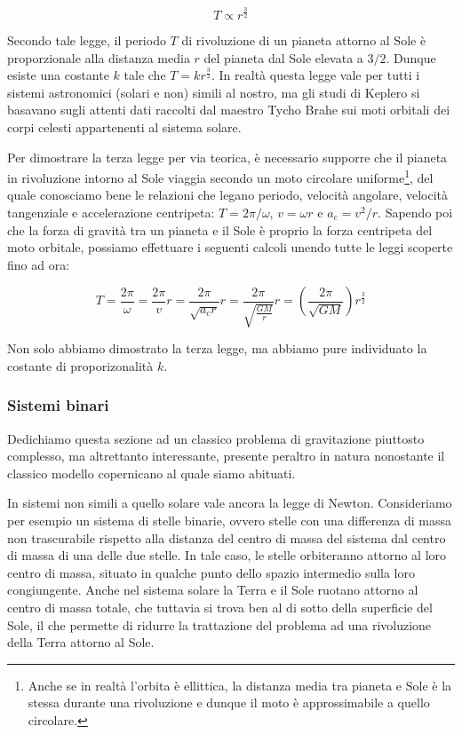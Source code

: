 \[ T \propto r^\frac{3}{2} \]

\noindent Secondo tale legge, il periodo $T$ di rivoluzione di un pianeta attorno al Sole
è proporzionale alla distanza media $r$ del pianeta dal Sole elevata a $3/2$. Dunque esiste
una costante $k$ tale che $T = kr^\frac{3}{2}$. In realtà
questa legge vale per tutti i sistemi astronomici (solari e non) simili al nostro, ma
gli studi di Keplero si basavano sugli attenti dati raccolti dal maestro Tycho Brahe
sui moti orbitali dei corpi celesti appartenenti al sistema solare.

Per dimostrare la terza legge per via teorica, è necessario supporre che il pianeta
in rivoluzione intorno al Sole viaggia secondo un moto circolare uniforme\footnote{Anche se in realtà
l'orbita è ellittica, la distanza media tra pianeta e Sole è la stessa durante una rivoluzione e dunque il
moto è approssimabile a quello circolare.}, del quale conosciamo bene le relazioni che legano periodo, velocità
angolare, velocità tangenziale e accelerazione centripeta: $T = 2\pi/\omega$, $v = \omega r$ e
$a_c = v^2/r$.
Sapendo poi che la forza di gravità tra un pianeta e il Sole è proprio la forza
centripeta del moto orbitale, possiamo effettuare i seguenti calcoli unendo tutte
le leggi scoperte fino ad ora:

\[ T = \frac{2\pi}{\omega} = \frac{2\pi}{v}r = \frac{2\pi}{\sqrt{a_c r}}r = \frac{2\pi}{\sqrt{\frac{GM}{r}}}r = \left(\frac{2\pi}{\sqrt{GM}}\right)r^\frac{3}{2} \]

\noindent Non solo abbiamo dimostrato la terza legge, ma abbiamo pure individuato la
costante di proporizonalità $k$.

\subsubsection*{Sistemi binari}
Dedichiamo questa sezione ad un classico problema di gravitazione piuttosto complesso,
ma altrettanto interessante, presente peraltro in natura nonostante il classico
modello copernicano al quale siamo abituati.

In sistemi non simili a quello solare vale ancora la legge di Newton. Consideriamo
per esempio un sistema di stelle binarie, ovvero stelle con una differenza di massa
non trascurabile rispetto alla distanza del centro di massa del sistema dal centro
di massa di una delle due stelle. In tale caso, le stelle orbiteranno attorno al
loro centro di massa, situato in qualche punto dello spazio intermedio sulla loro
congiungente. Anche nel sistema solare la Terra e il Sole ruotano attorno al centro
di massa totale, che tuttavia si trova ben al di sotto della superficie del Sole,
il che permette di ridurre la trattazione del problema ad una rivoluzione della
Terra attorno al Sole.